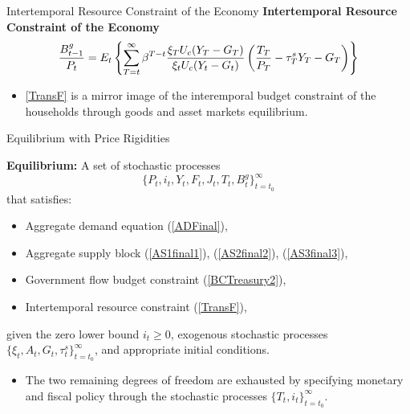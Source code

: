 \documentclass[11pt,aspectratio=169]{beamer}
\begin{document}
\begin{frame}{Intertemporal Resource Constraint of the Economy}
\small
\textbf{Intertemporal Resource Constraint of the Economy}
\begin{equation}
\frac{B_{t-1}^{g}}{P_{t}}=E_{t}\left\{ \sum_{T=t}^{\infty }\beta ^{T-t}\frac{%
\xi _{T}U_{c}(Y_{T}-G_{T})}{\xi _{t}U_{c}(Y_{t}-G_{t})}\left( \frac{T_{T}}{%
P_{T}}-\tau _{T}^{s}Y_{T}-G_{T}\right) \right\}  \label{TransF}
\end{equation}
\begin{itemize}
    \item \eqref{TransF} is a mirror image of the interemporal budget constraint of the households through goods and asset markets equilibrium.
\end{itemize}
\end{frame}
\begin{frame}[label=EquilibriumRigid]{Equilibrium with Price Rigidities}
\small

\textbf{Equilibrium:}  
A set of stochastic processes 
\[
\{ P_t, i_t, Y_t, F_t, J_t, T_t, B_t^g \}_{t=t_0}^\infty
\]
that satisfies:

\begin{itemize}
  \item Aggregate demand equation (\ref{ADFinal}),
  \item Aggregate supply block (\ref{AS1final1}), (\ref{AS2final2}), (\ref{AS3final3}),
  \item Government flow budget constraint (\ref{BCTreasury2}),
  \item Intertemporal resource constraint (\ref{TransF}),
\end{itemize}

given the zero lower bound $i_t \ge 0$,  
exogenous stochastic processes $\{\xi_t, A_t, G_t, \tau_t^s\}_{t=t_0}^\infty$,  
and appropriate initial conditions.

\begin{itemize}
  \item The two remaining degrees of freedom are exhausted by specifying monetary and fiscal policy through the stochastic processes $\{T_t, i_t\}_{t=t_0}^\infty$.

\end{itemize}

\end{frame}
\end{document}
